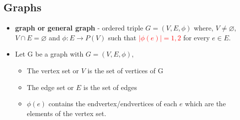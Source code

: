 \subsection{Graphs}
\begin{itemize}
 \item \textbf{graph or general graph} - ordered triple $G=(V,E,\phi)$ where, $V\neq\varnothing$, $V \cap E = \varnothing$ and $\phi:E \rightarrow P(V)$ such that \textcolor{red}{$|\phi(e)|={1,2}$} for every $e \in E$.
 \item Let G be a graph with $G = (V,E,\phi)$,
	\begin{itemize}
		\item The vertex set or $V$ is the set of vertices of G
		\item The edge set or $E$ is the set of edges
		\item $\phi(e)$ contains the endvertex/endvertices of each $e$ which are the elements of the vertex set. 
	\end{itemize}	 
\begin{figure}[h]
\centering
{}
\end{figure}
\end{itemize}
